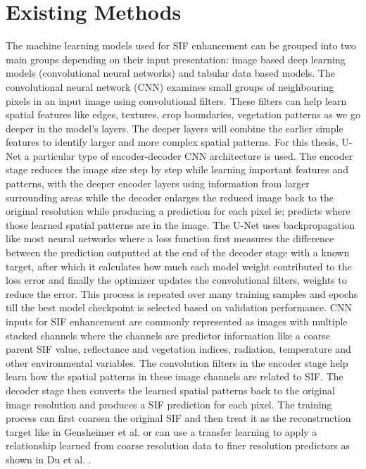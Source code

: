 \section{Existing Methods}

The machine learning models used for SIF enhancement can be grouped into two main groups depending on their input presentation: image based deep learning models (convolutional neural networks) and tabular data based models. The convolutional neural network (CNN) examines small groups of neighbouring pixels in an input image using convolutional filters. These filters can help learn spatial features like edges, textures, crop boundaries, vegetation patterns as we go deeper in the model's layers. The deeper layers will combine the earlier simple features to identify larger and more complex spatial patterns. For this thesis, U-Net \cite{ronneberger2015u} a particular type of encoder-decoder CNN architecture is used. The encoder stage reduces the image size step by step while learning important features and patterns, with the deeper encoder layers using information from larger surrounding areas while the decoder enlarges the reduced image back to the original resolution while producing a prediction for each pixel ie; predicts where those learned spatial patterns are in the image. The U-Net uses backpropagation like most neural networks where a loss function first measures the difference between the prediction outputted at the end of the decoder stage with a known target, after which it calculates how much each model weight contributed to the loss error and finally the optimizer updates the convolutional filters, weights to reduce the error. This process is repeated over many training samples and epochs till the best model checkpoint is selected based on validation performance. CNN inputs for SIF enhancement are commonly represented as images with multiple stacked channels where the channels are predictor information like a coarse parent SIF value, reflectance and vegetation indices, radiation, temperature and other environmental variables. The convolution filters in the encoder stage help learn how the spatial patterns in these image channels are related to SIF. The decoder stage then converts the learned spatial patterns back to the original image resolution and produces a SIF prediction for each pixel. The training process can first coarsen the original SIF and then treat it as the reconstruction target like in Gensheimer et al. \cite{gensheimer2022convolutional} or can use a transfer learning to apply a relationship learned from coarse resolution data to finer resolution predictors as shown in Du et al. \cite{du2025cnsif}.


